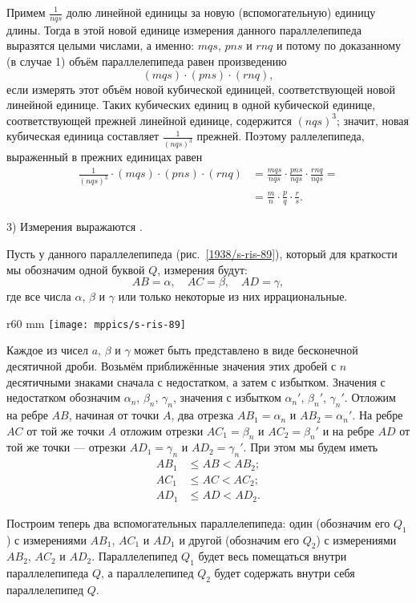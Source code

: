 Примем $\frac 1{nqs}$ долю линейной единицы за новую (вспомогательную) единицу длины.
Тогда в этой новой единице измерения данного параллелепипеда выразятся целыми числами, а именно: $mqs$, $pns$ и $rnq$
и потому по доказанному (в случае 1) объём параллелепипеда равен произведению
\[(mqs)\cdot (pns)\cdot (rnq),\]
 если измерять этот объём новой кубической единицей, соответствующей новой линейной единице.
Таких кубических единиц в одной кубической единице, соответствующей прежней линейной единице, содержится $(nqs)^3$; значит, новая кубическая единица составляет $\tfrac1{(nqs)^3}$ прежней.
Поэтому раллелепипеда, выраженный в прежних единицах равен
\begin{align*}\frac1{(nqs)^3}\cdot(mqs)\cdot (pns)\cdot (rnq)&=\frac{mqs}{nqs}\cdot \frac{pns}{nqs}\cdot \frac{rnq}{nqs}= 
\\&=\frac mn\cdot \frac pq\cdot \frac rs.
\end{align*}


3) Измерения выражаются .

Пусть у данного параллелепипеда (рис.~\ref{1938/s-ris-89}), который для краткости мы обозначим одной буквой $Q$, измерения будут:
\[AB=\alpha,\quad AC=\beta,\quad AD=\gamma,\]
где все числа $\alpha$, $\beta$ и $\gamma$ или только некоторые из них иррациональные.

\begin{wrapfigure}{r}{60 mm}
\vskip-0mm
\centering
\texttt{[image: mppics/s-ris-89]}
\caption{}\label{1938/s-ris-89}
\vskip-0mm
\end{wrapfigure}

Каждое из чисел $a$, $\beta$ и $\gamma$ может быть представлено в виде бесконечной десятичной дроби.
Возьмём приближённые значения этих дробей с $n$ десятичными знаками сначала с недостатком, а затем с избытком.
Значения с недостатком обозначим $\alpha_n$, $\beta_n$, $\gamma_n$, значения с избытком $\alpha_n'$, $\beta_n'$, $\gamma_n'$.
Отложим на ребре $AB$, начиная от точки $A$, два отрезка $AB_1 = \alpha_n$ и $AB_2=\alpha_n'$.
На ребре $AC$ от той же точки $A$ отложим отрезки $AC_1=\beta_n$ и $AC_2=\beta_n'$ и на ребре $AD$ от той же точки — отрезки $AD_1=\gamma_n$ и $AD_2=\gamma_n'$.
При этом мы будем иметь
\begin{align*}
AB_1&\le AB<AB_2;
\\
AC_1&\le AC<AC_2;
\\ 
AD_1&\le AD<AD_2.
\end{align*}

Построим теперь два вспомогательных параллелепипеда: один (обозначим его $Q_1$) с измерениями $AB_1$, $AC_1$ и $AD_1$ и другой (обозначим его $Q_2$) с измерениями $AB_2$, $AC_2$ и $AD_2$.
Параллелепипед $Q_1$ будет весь помещаться внутри параллелепипеда $Q$, а параллелепипед $Q_2$ будет содержать внутри себя параллелепипед $Q$.

